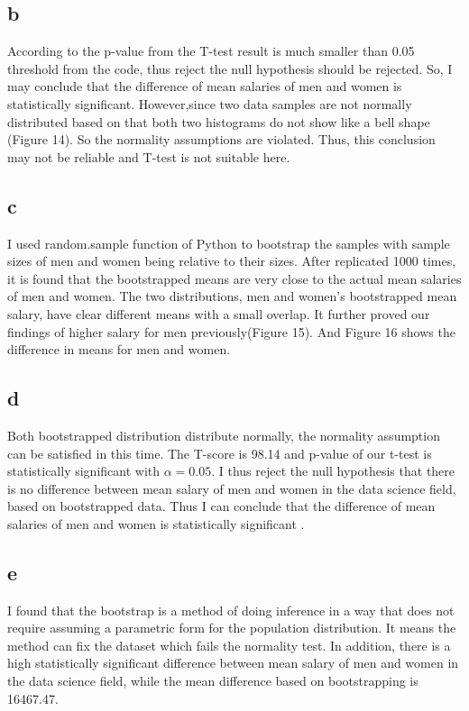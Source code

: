 \documentclass[10pt,onecolumn,letterpaper]{article}
\begin{document}
\subsection*{b}
According to the p-value from the T-test result is much smaller than 0.05 threshold from the code, thus reject the null hypothesis should be rejected. So, I may conclude that the difference of mean salaries of men and women is statistically significant. However,since two data samples are not normally distributed based on that both two histograms do not show like a bell shape (Figure 14). So the normality assumptions are violated. Thus, this conclusion may not be reliable and T-test is not suitable here.

\subsection*{c}
I used random.sample function of Python to bootstrap the samples with sample sizes of men and women being relative to their sizes. After replicated 1000 times, it is found that the bootstrapped means are very close to the actual mean salaries of men and women. The two distributions, men and women’s bootstrapped mean salary, have clear different means with a small overlap. It further proved our findings of higher salary for men previously(Figure 15). And Figure 16 shows the difference in means for men and women.

\subsection*{d}
 Both bootstrapped distribution distribute normally, the normality assumption can be satisfied in this time. The T-score is 98.14 and p-value of our t-test is statistically significant with $\alpha = 0.05$. I thus reject the null hypothesis that there is no difference between mean salary of men and women in the data science field, based on bootstrapped data. Thus I can conclude that the difference of mean salaries of men and women is statistically significant . 
 
\subsection*{e}
I found that the bootstrap is a method of doing inference in a way that does not require assuming a parametric form for the population distribution. It means the method can fix the dataset which fails the normality test. In addition, there is a high statistically significant difference between mean salary of men and women in the data science field, while the mean difference based on bootstrapping is 16467.47. 
\end{document}
